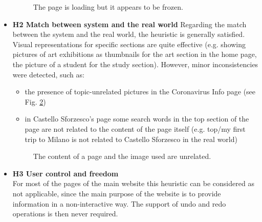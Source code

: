 \begin{itemize}
\begin{figure}[!ht]
\begin{minipage}{\linewidth}
                \captionsetup{justification=centering}
                \caption{The page is loading but it appears to be frozen.}
                \label{H1-2}
            \end{minipage}
        \end{figure}
    \pagebreak
    \item \textbf{H2 Match between system and the real world}
        Regarding the match between the system and the real world, the heuristic is generally satisfied. Visual representations for specific sections are quite effective (e.g. showing pictures of art exhibitions as thumbnails for the art section in the home page, the picture of a student for the study section). However, minor inconsistencies were detected, such as:
        \begin{itemize}
            \item the presence of topic-unrelated pictures in the Coronavirus Info page (see Fig. \ref{H2-1})
            \item in Castello Sforzesco's page some search words in the top section of the page are not related to the content of the page itself (e.g. top/my first trip to Milano is not related to Castello Sforzesco in the real world)
        \end{itemize}
        \begin{figure}[!ht]
            \begin{minipage}{\linewidth}
                \centering
                \captionsetup{justification=centering}
                \caption{The content of a page and the image used are unrelated.}
                \label{H2-1}
            \end{minipage}
        \end{figure}
    \item \textbf{H3 User control and freedom}\\
        For most of the pages of the main website this heuristic can be considered as not applicable, since the main purpose of the website is to provide information in a non-interactive way. The support of undo and redo operations is then never required.\\

\end{itemize}
